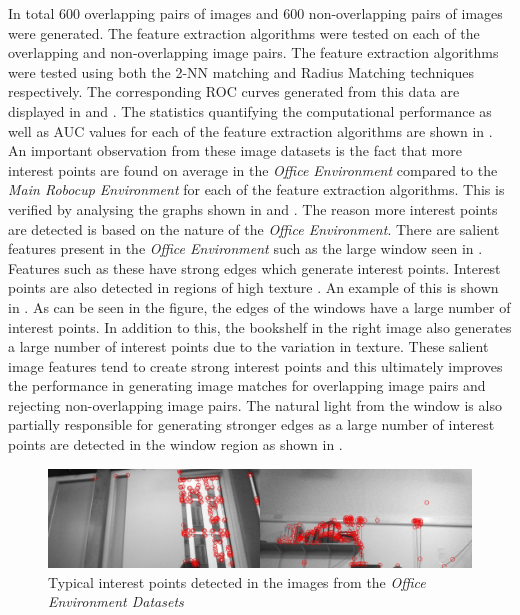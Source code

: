 In total $600$ overlapping pairs of images and $600$ non-overlapping pairs of images were generated. The feature extraction algorithms were tested on each of the overlapping and non-overlapping image pairs. The feature extraction algorithms were tested using both the 2-NN matching and Radius Matching techniques respectively. The corresponding ROC curves generated from this data are displayed in  and . The statistics quantifying the computational performance as well as AUC values for each of the feature extraction algorithms are shown in . \\


An important observation from these image datasets is the fact that more interest points are found on average in the \textit{Office Environment} compared to the \textit{Main Robocup Environment} for each of the feature extraction algorithms. This is verified by analysing the graphs shown in  and . The reason more interest points are detected is based on the nature of the \textit{Office Environment}. There are salient features present in the \textit{Office Environment} such as the large window seen in . Features such as these have strong edges which generate interest points. Interest points are also detected in regions of high texture \citep{Szeliski2010}. An example of this is shown in . As can be seen in the figure, the edges of the windows have a large number of interest points. In addition to this, the bookshelf  in the right image also generates a large number of interest points due to the variation in texture. These salient image features tend to create strong interest points and this ultimately improves the performance in generating image matches for overlapping image pairs and rejecting non-overlapping image pairs. The natural light from the window is also partially responsible for generating stronger edges as a large number of interest points are detected in the window region as shown in . \\



\begin{figure}
  \centering
    \includegraphics[width=1.0\textwidth]{../Drawings/Matching/dataset2_interestPoints.jpg}
    \caption{Typical interest points detected in the images from the \textit{Office Environment Datasets}} 
    \label{fig:oe_interestPoints}
\end{figure}


